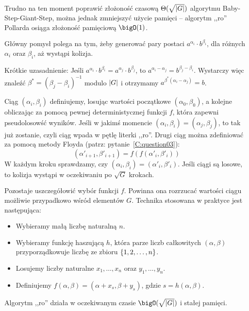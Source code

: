 Trudno na ten moment poprawić złożoność czasową \( \Theta(\sqrt{\left\lvert G\right\rvert}) \) algorytmu Baby-Step-Giant-Step, można jednak zmniejszyć użycie pamięci -- algorytm ,,ro'' Pollarda osiąga złożoność pamięciową \( \bigO(1) \).

Główny pomysł polega na tym, żeby generować pary postaci \( a^{\alpha_i} \cdot b^{\beta_i} \), dla różnych \( \alpha_i \) oraz \( \beta_i \), aż wystąpi kolizja.

Krótkie uzasadnienie: Jeśli \( a^{\alpha_i} \cdot b^{\beta_i} = a^{\alpha_j} \cdot b^{\beta_j} \), to \( a^{\alpha_i - \alpha_j} = b^{\beta_j - \beta_i} \). Wystarczy więc znaleźć \( \beta^{*} = (\beta_j - \beta_i)^{-1} \) modulo \( \left\lvert G\right\rvert \) i otrzymamy \( a^{\beta^{*} (\alpha_i - \alpha_j)} = b \).

Ciąg \( (\alpha_i, \beta_i) \) definiujemy, losując wartości początkowe \( (\alpha_0, \beta_0) \), a kolejne obliczając za pomocą pewnej deterministycznej funkcji \( f \), która zapewni pseudolosowść wyników.
Jeśli w jakimś momencie \( (\alpha_i, \beta_i) = (\alpha_j, \beta_j) \), to tak już zostanie, czyli ciąg wpada w pętlę literki ,,ro''. Drugi ciąg można zdefiniować za pomocą metody Floyda (patrz: pytanie~\ref{C:question03}):
\[ (\alpha'_{i+1}, \beta'_{i+1}) = f(f(\alpha'_i, \beta'_i)) \]
W każdym kroku sprawdzamy, czy \( (\alpha_i, \beta_i) = (\alpha'_i, \beta'_i) \). Jeśli ciągi są losowe, to kolizja wystąpi w oczekiwaniu po \( \sqrt{G} \) krokach.

Pozostaje uszczegółowić wybór funkcji \( f \). Powinna ona rozrzucać wartości ciągu możliwie przypadkowo wśród elementów \( G \). Technika stosowana w praktyce jest następująca:
\begin{itemize}
    \onehalfspacing
    \item Wybieramy małą liczbę naturalną \( n \).
    \item Wybieramy funkcję haszującą \( h \), która parze liczb całkowitych \( (\alpha, \beta) \) przyporządkowuje liczbę ze zbioru \( \set{1, 2, \dots, n} \).
    \item Losujemy liczby naturalne \( x_1, \dots, x_n \) oraz \( y_1, \dots, y_n \).
    \item Definiujemy \( f(\alpha, \beta) = (\alpha + x_s, \beta + y_s) \), gdzie \( s = h(\alpha, \beta) \).
\end{itemize}

Algorytm ,,ro'' działa w oczekiwanym czasie \( \bigO(\sqrt{\abs{G}}) \) i stałej pamięci.